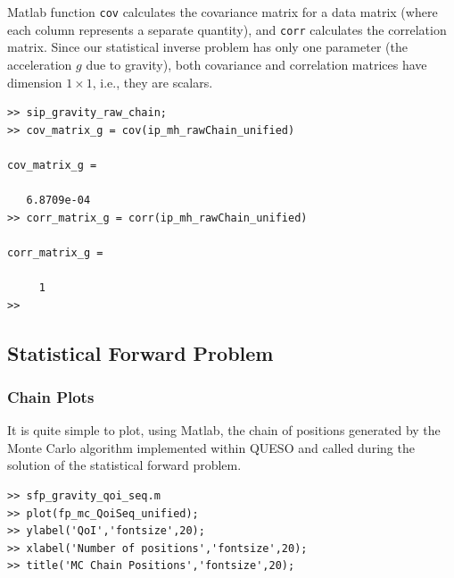 Matlab function \verb+cov+ calculates the covariance matrix for a data matrix (where each column represents a separate quantity), and \verb+corr+ calculates the correlation matrix.
Since our statistical inverse problem has only one parameter (the acceleration $g$ due to gravity), both covariance and correlation matrices have dimension $1 \times 1$, i.e., they are scalars.

\begin{lstlisting}[label=matlab:cov_matrix,caption={Matlab code for finding the covariance matrix.}]
% inside Matlab
>> sip_gravity_raw_chain;
>> cov_matrix_g = cov(ip_mh_rawChain_unified)
   
cov_matrix_g =

   6.8709e-04
>> corr_matrix_g = corr(ip_mh_rawChain_unified)

corr_matrix_g =

     1
>>
\end{lstlisting}


\subsection{Statistical Forward Problem}


\subsubsection{Chain Plots}

It is quite simple to plot, using Matlab, the chain of positions generated by the Monte Carlo algorithm implemented within QUESO and called during the solution of the statistical forward problem. 

\begin{lstlisting}[label=matlab:chain_qoi,caption={Matlab code for the chain plot.}]
% inside Matlab
>> sfp_gravity_qoi_seq.m
>> plot(fp_mc_QoiSeq_unified);
>> ylabel('QoI','fontsize',20);
>> xlabel('Number of positions','fontsize',20);
>> title('MC Chain Positions','fontsize',20);
\end{lstlisting}

